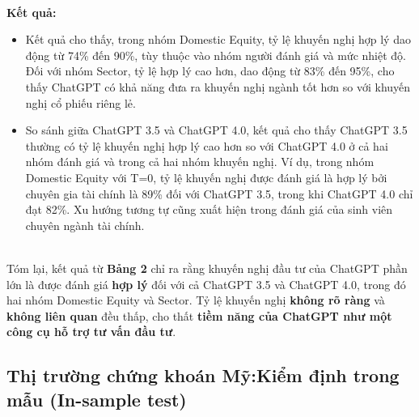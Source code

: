 \documentclass[a4paper,12pt]{article}
\begin{document}
\\ 
\textbf{Kết quả:}\begin{itemize}
    \item Kết quả cho thấy, trong nhóm Domestic Equity, tỷ lệ khuyến nghị hợp lý dao động từ 74\% đến 90\%, tùy thuộc vào nhóm người đánh giá và mức nhiệt độ. Đối với nhóm Sector, tỷ lệ hợp lý cao hơn, dao động từ 83\% đến 95\%, cho thấy ChatGPT có khả năng đưa ra khuyến nghị ngành tốt hơn so với khuyến nghị cổ phiếu riêng lẻ.
    \item So sánh giữa ChatGPT 3.5 và ChatGPT 4.0, kết quả cho thấy ChatGPT 3.5 thường có tỷ lệ khuyến nghị hợp lý cao hơn so với ChatGPT 4.0 ở cả hai nhóm đánh giá và trong cả hai nhóm khuyến nghị. Ví dụ, trong nhóm Domestic Equity với T=0, tỷ lệ khuyến nghị được đánh giá là hợp lý bởi chuyên gia tài chính là 89\% đối với ChatGPT 3.5, trong khi ChatGPT 4.0 chỉ đạt 82\%. Xu hướng tương tự cũng xuất hiện trong đánh giá của sinh viên chuyên ngành tài chính.
\end{itemize}
\noindent
\\ Tóm lại, kết quả từ \textbf{Bảng 2} chỉ ra rằng khuyến nghị đầu tư của ChatGPT phần lớn là được đánh giá \textbf{hợp lý} đối với cả ChatGPT 3.5 và ChatGPT 4.0, trong đó hai nhóm Domestic Equity và Sector. Tỷ lệ khuyến nghị \textbf{không rõ ràng} và \textbf{không liên quan} đều thấp, cho thất \textbf{tiềm năng của ChatGPT như một công cụ hỗ trợ tư vấn đầu tư}.

\subsection{Thị trường chứng khoán Mỹ:Kiểm định trong mẫu (In-sample test)}
\end{document}
